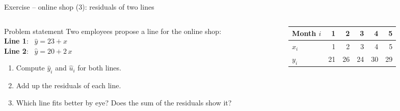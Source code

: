 \documentclass[aspectratio=169,11pt]{beamer}
\newcommand{\shoppoints}{\addplot[only marks, mark=*, mark size=2.6pt, color=hsbiblau]
  coordinates {(1,21) (2,26) (3,24) (4,30) (5,29)};}
\begin{document}
\begin{frame}{Exercise -- online shop (3): residuals of two lines}
  \begin{columns}[T]
    \begin{column}{0.45\textwidth}
      \small
      \begin{block}{Problem statement}
        Two employees propose a line for the online shop:\\[3pt]
        {\color{hsbiorange!85!black}\textbf{Line 1}}: \ $\hat{y} = 23 + x$\\
        {\color{hsbiviolett}\textbf{Line 2}}: \ $\hat{y} = 20 + 2\,x$
        \begin{enumerate}
          \item Compute $\hat{y}_i$ and $\hat{u}_i$ for both lines.
          \item Add up the residuals of each line.
          \item Which line fits better by eye? Does the sum of the
                residuals show it?
        \end{enumerate}
      \end{block}
    \end{column}
    \begin{column}{0.53\textwidth}
      \begin{center}
        \small\renewcommand{\arraystretch}{1.05}
        \begin{tabular}{l*{5}{r}}
          \toprule
          Month $i$ & 1  & 2  & 3  & 4  & 5  \\
          \midrule
          $x_i$     & 1  & 2  & 3  & 4  & 5  \\
          $y_i$     & 21 & 26 & 24 & 30 & 29 \\
          \bottomrule
        \end{tabular}
      \end{center}
    \end{column}
  \end{columns}
\end{frame}
\end{document}
